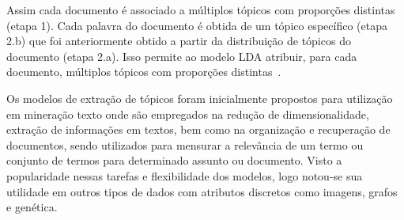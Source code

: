 Assim cada documento é associado a múltiplos tópicos com proporções distintas (etapa 1). Cada palavra do documento é obtida de um tópico específico (etapa 2.b) que foi anteriormente obtido a partir da distribuição de tópicos do documento (etapa 2.a). Isso permite ao modelo LDA atribuir, para cada documento, múltiplos tópicos com proporções distintas~\cite{Blei2012}.


Os modelos de extração de tópicos foram inicialmente propostos para utilização em mineração texto onde são empregados na redução de dimensionalidade, extração de informações em textos, bem como na organização e recuperação de documentos, sendo utilizados para mensurar a relevância de um termo ou conjunto de termos para determinado assunto ou documento. Visto a popularidade nessas tarefas e flexibilidade dos modelos, logo notou-se sua utilidade em outros tipos de dados com atributos discretos como imagens, grafos e genética. 



























